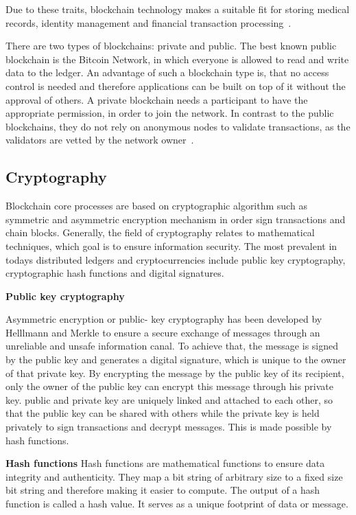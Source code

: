 Due to these traits, blockchain technology makes a suitable fit for storing  medical records, identity management and financial transaction processing~\cite{Application}.

There are two types of blockchains: private and public. The best known public blockchain is the Bitcoin Network, in which everyone is allowed to read and write data to the ledger.
An advantage of such a blockchain type is, that no access control is needed and therefore applications can be built on top of it without the approval of others.
A private blockchain needs a participant to have the appropriate permission, in order to join the network. In contrast to the public blockchains, they do not rely on anonymous nodes to validate transactions, as the validators are vetted by the network owner~\cite{Private}.

\subsection{Cryptography}
Blockchain core processes are based on cryptographic algorithm such as symmetric and asymmetric encryption mechanism in order sign transactions and chain blocks. 
Generally, the field of cryptography relates to mathematical techniques, which goal is to ensure information security. The most prevalent in todays distributed ledgers and cryptocurrencies include public key cryptography, cryptographic hash functions and digital signatures. 

\textbf{Public key cryptography}

Asymmetric encryption or public- key cryptography has been developed by Helllmann and Merkle to ensure a secure exchange of messages through an unreliable and unsafe information canal. To achieve that, the message is signed by the public key and generates a digital signature, which is unique to the owner of that private key. By encrypting the message by the public key of its recipient, only the owner of the public key can encrypt this message through his private key. public and private key are uniquely linked and attached to each other, so that the public key can be shared with others while the private key is held privately to sign transactions and decrypt messages. This is made possible by hash functions. 

\textbf{Hash functions}
Hash functions are mathematical functions to ensure data integrity and authenticity. They map a bit string of arbitrary size to a fixed size bit string and therefore making it easier to compute. The output of a hash function is called a hash value. It serves as a unique footprint of data or message. 

